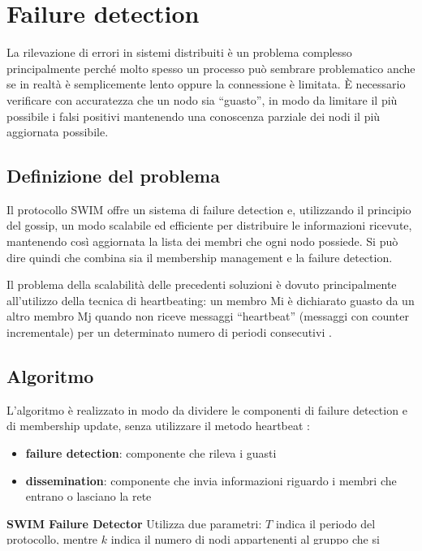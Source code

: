 \section{Failure detection}
La rilevazione di errori in sistemi distribuiti è un problema complesso \cite{failure_detection} principalmente perché molto spesso un processo può sembrare problematico anche se in realtà è semplicemente lento oppure la connessione è limitata. È necessario verificare con accuratezza che un nodo sia “guasto”, in modo da limitare il più possibile i falsi positivi mantenendo una conoscenza parziale dei nodi il più aggiornata possibile. 
\subsection{Definizione del problema}
Il protocollo SWIM \cite{swim} offre un sistema di failure detection e, utilizzando il principio del gossip, un modo scalabile ed efficiente per distribuire le informazioni ricevute, mantenendo così aggiornata la lista dei membri che ogni nodo possiede. Si può dire quindi che combina sia il membership management e la failure detection.

Il problema della scalabilità delle precedenti soluzioni è dovuto principalmente all’utilizzo della tecnica di heartbeating: un membro Mi è dichiarato guasto da un altro membro Mj quando non riceve messaggi “heartbeat” (messaggi con counter incrementale) per un determinato numero di periodi consecutivi \cite{swim}.
\subsection{Algoritmo}
L’algoritmo è realizzato in modo da dividere le componenti di failure detection e di membership update, senza utilizzare il metodo heartbeat \cite{swim}:
\begin{itemize}
    \item \textbf{failure detection}: componente che rileva i guasti
    \item \textbf{dissemination}: componente che invia informazioni riguardo i membri che entrano o lasciano la rete
\end{itemize}

\textbf{SWIM Failure Detector} Utilizza due parametri: $T$ indica il periodo del protocollo, mentre $k$ indica il numero di nodi appartenenti al gruppo che si occupa di contattare un nodo che non ha inviato risposte. Ad ogni round (di lunghezza $T$), un nodo $M_i$ sceglie un altro nodo $M_j$ dalla sua lista di vicini e invia un messaggio \textit{ping} e aspetta la risposta \textit{ack}. Se questa non arriva dopo un determinato periodo, inferiore a $T$, $M_i$ contatta i $k$ nodi scelti all’avvio del protocollo e chiede loro, attraverso un messaggio \textit{ping-req}, di contattare il nodo $M_j$. Se nessuno di questi nodi riceve risposta ed invia la conferma della salute del nodo $M_j$, questo viene dichiarato guasto nella lista di $M_i$, che si occuperà di distribuire la scoperta a tutta la rete.

